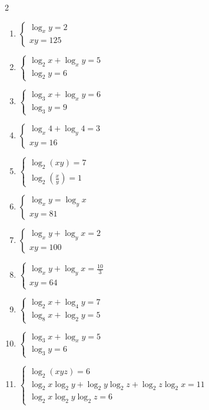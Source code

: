 \documentclass[12pt,a4paper]{article}
\begin{document}
\begin{multicols}{2}
\begin{enumerate}[leftmargin=*, itemsep=6pt]
\item \(\begin{cases}\log_xy=2\\ xy=125\end{cases}\)

\item \(\begin{cases}\log_2x+\log_xy=5\\ \log_2y=6\end{cases}\)

\item \(\begin{cases}\log_3x+\log_xy=6\\ \log_3y=9\end{cases}\)

\item \(\begin{cases}\log_x4+\log_y4=3\\ xy=16\end{cases}\)

\item \(\begin{cases}\log_2(xy)=7\\ \log_2\left(\frac{x}{y}\right)=1\end{cases}\)

\item \(\begin{cases}\log_xy=\log_yx\\ xy=81\end{cases}\)

\item \(\begin{cases}\log_xy+\log_yx=2\\ xy=100\end{cases}\)

\item \(\begin{cases}\log_xy+\log_yx=\frac{10}{3}\\ xy=64\end{cases}\)

\item \(\begin{cases}\log_2x+\log_4y=7\\ \log_8x+\log_2y=5\end{cases}\)

\item \(\begin{cases}\log_3x+\log_xy=5\\ \log_3y=6\end{cases}\)

\item \(\begin{cases}\log_2(xyz)=6\\ \log_2x\log_2y+\log_2y\log_2z+\log_2z\log_2x=11\\ \log_2x\log_2y\log_2z=6\end{cases}\)

\end{enumerate}
\end{multicols}
\newpage
\end{document}
